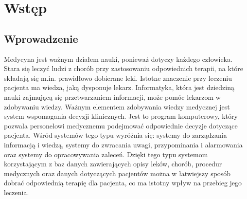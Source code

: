 \chapter{Wstęp}
\section{Wprowadzenie}

\begin{spacing}{1.5}
Medycyna jest ważnym działem nauki, ponieważ dotyczy każdego człowieka. 
Stara się leczyć ludzi z chorób przy zastosowaniu odpowiednich terapii, na które składają się m.in. prawidłowo dobierane leki. Istotne znaczenie przy leczeniu pacjenta ma wiedza, jaką dysponuje lekarz. Informatyka, która jest dziedziną nauki zajmującą się przetwarzaniem informacji, może pomóc lekarzom w zdobywaniu wiedzy. 
Ważnym elementem zdobywania wiedzy medycznej jest system wspomagania decyzji klinicznych. Jest to program komputerowy, który pozwala personelowi medycznemu podejmować odpowiednie decyzje dotyczące pacjenta. Wśród systemów tego typu wyróżnia się: 
systemy do zarządzania informacją i wiedzą, systemy do zwracania uwagi, przypominania i alarmowania oraz systemy do opracowywania zaleceń.
Dzięki tego typu systemom korzystającym z baz danych zawierających opisy leków, chorób, procedur medycznych oraz danych dotyczących pacjentów można w łatwiejszy sposób dobrać odpowiednią terapię dla pacjenta, co ma istotny wpływ na przebieg jego leczenia. 


\end{spacing}
